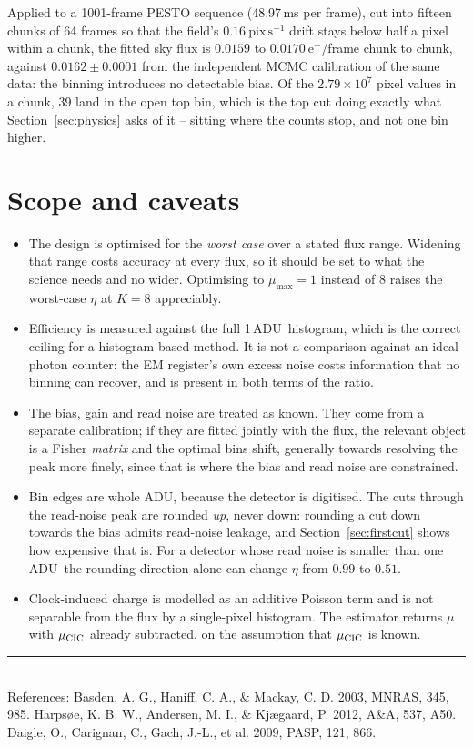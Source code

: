 \documentclass[11pt,a4paper]{article}
\newcommand{\ADU}{\ensuremath{\mathrm{ADU}}}
\newcommand{\eminus}{\ensuremath{\mathrm{e}^-}}
\begin{document}
Applied to a 1001-frame PESTO sequence (48.97\,ms per frame), cut into fifteen
chunks of 64 frames so that the field's $0.16\ \mathrm{pix\,s^{-1}}$ drift stays
below half a pixel within a chunk, the fitted sky flux is $0.0159$ to
$0.0170\ \eminus$/frame chunk to chunk, against $0.0162 \pm 0.0001$ from the
independent MCMC calibration of the same data: the binning introduces no
detectable bias. Of the $2.79 \times 10^{7}$ pixel values in a chunk, 39 land in
the open top bin, which is the top cut doing exactly what
Section~\ref{sec:physics} asks of it -- sitting where the counts stop, and not
one bin higher.

\section{Scope and caveats}

\begin{itemize}\itemsep3pt
\item The design is optimised for the \emph{worst case} over a stated flux
      range. Widening that range costs accuracy at every flux, so it should be
      set to what the science needs and no wider. Optimising to
      $\mu_{\max} = 1$ instead of $8$ raises the worst-case $\eta$ at $K=8$
      appreciably.

\item Efficiency is measured against the full 1\,\ADU\ histogram, which is the
      correct ceiling for a histogram-based method. It is not a comparison
      against an ideal photon counter: the EM register's own excess noise costs
      information that no binning can recover, and is present in both terms of
      the ratio.

\item The bias, gain and read noise are treated as known. They come from a
      separate calibration; if they are fitted jointly with the flux, the
      relevant object is a Fisher \emph{matrix} and the optimal bins shift,
      generally towards resolving the peak more finely, since that is where
      the bias and read noise are constrained.

\item Bin edges are whole \ADU, because the detector is digitised. The cuts
      through the read-noise peak are rounded \emph{up}, never down: rounding a
      cut down towards the bias admits read-noise leakage, and
      Section~\ref{sec:firstcut} shows how expensive that is. For a detector
      whose read noise is smaller than one \ADU\ the rounding direction alone
      can change $\eta$ from $0.99$ to $0.51$.

\item Clock-induced charge is modelled as an additive Poisson term and is not
      separable from the flux by a single-pixel histogram. The estimator
      returns $\mu$ with $\mu_{\rm CIC}$ already subtracted, on the assumption
      that $\mu_{\rm CIC}$ is known.
\end{itemize}

\bigskip
\noindent\rule{\textwidth}{0.4pt}\\
\footnotesize
References: Basden, A. G., Haniff, C. A., \& Mackay, C. D. 2003, MNRAS, 345,
985. Harps{\o}e, K. B. W., Andersen, M. I., \& Kj{\ae}gaard, P. 2012, A\&A,
537, A50. Daigle, O., Carignan, C., Gach, J.-L., et al. 2009, PASP, 121, 866.
\end{document}
